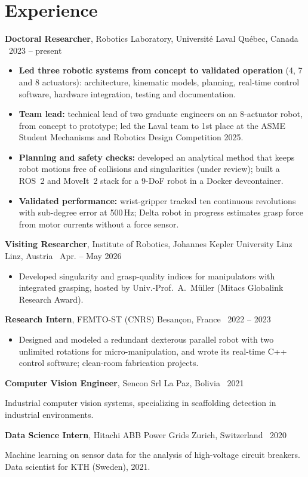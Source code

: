 \documentclass[10pt,letterpaper]{article}
\newcommand{\role}[4]{\textbf{#1}, #2 \hfill {\color{muted}#3 \textbar\ #4}\par}
\begin{document}
\section{Experience}
\role{Doctoral Researcher}{Robotics Laboratory, Universit\'e Laval}{Qu\'ebec, Canada}{2023 -- present}
\begin{itemize}
\item \textbf{Led three robotic systems from concept to validated operation} (4, 7 and 8 actuators): architecture,
kinematic models, planning, real-time control software, hardware integration, testing and documentation.
\item \textbf{Team lead:} technical lead of two graduate engineers on an 8-actuator robot, from concept to prototype;
led the Laval team to 1st place at the ASME Student Mechanisms and Robotics Design Competition 2025.
\item \textbf{Planning and safety checks:} developed an analytical method that keeps robot motions free of collisions and
singularities (under review); built a ROS~2 and MoveIt~2 stack for a 9-DoF robot in a Docker devcontainer.
\item \textbf{Validated performance:} wrist-gripper tracked ten continuous revolutions with sub-degree error at 500\,Hz;
Delta robot in progress estimates grasp force from motor currents without a force sensor.
\end{itemize}

\vspace{3pt}
\role{Visiting Researcher}{Institute of Robotics, Johannes Kepler University Linz}{Linz, Austria}{Apr. -- May 2026}
\begin{itemize}
\item Developed singularity and grasp-quality indices for manipulators with integrated grasping, hosted by Univ.-Prof.~A.~M\"uller (Mitacs Globalink Research Award).
\end{itemize}

\vspace{3pt}
\role{Research Intern}{FEMTO-ST (CNRS)}{Besan\c{c}on, France}{2022 -- 2023}
\begin{itemize}
\item Designed and modeled a redundant dexterous parallel robot with two unlimited rotations for micro-manipulation, and wrote its real-time C++ control software; clean-room fabrication projects.
\end{itemize}

\vspace{3pt}
\role{Computer Vision Engineer}{Sencon Srl}{La Paz, Bolivia}{2021}
{\small Industrial computer vision systems, specializing in scaffolding detection in industrial environments.}\par\vspace{2pt}
\role{Data Science Intern}{Hitachi ABB Power Grids}{Zurich, Switzerland}{2020}
{\small Machine learning on sensor data for the analysis of high-voltage circuit breakers. Data scientist for KTH (Sweden), 2021.}
\end{document}
